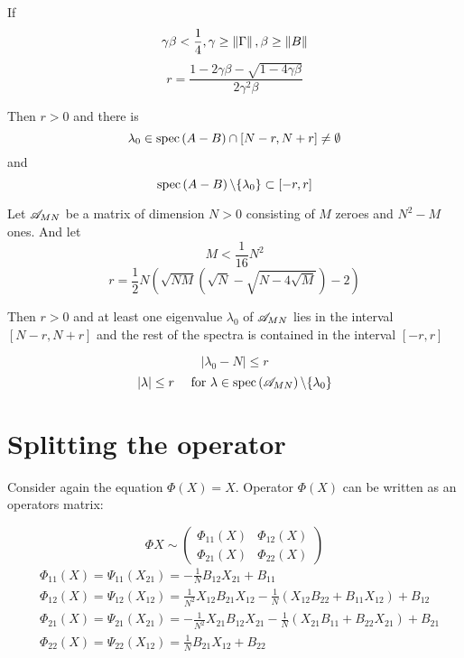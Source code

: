 \documentclass{article}
\begin{document}
\begin{lemma}
    If
    \[\gamma\beta<\frac14, \gamma\geq\left\|{\Gamma}\right\|, \beta\geq\left\|{B}\right\|\]
    \[r = \frac{1 - 2\gamma\beta - \sqrt{1-4\gamma\beta}}{2 \gamma^2 \beta}\]

    Then $r>0$ and there is
	\[ \lambda_0\in\mathrm{spec}\left({A-B}\right) \cap \left[N-r,N+r\right] \neq\emptyset \]
	and
	\[ \mathrm{spec}\left({A-B}\right)\backslash\{\lambda_0\} \subset \left[-r,r\right] \]
\end{lemma}
\begin{thm}
    Let \( \mathscr{A}_{{M}{N}} \) be a matrix of dimension \( N>0 \)
    consisting of \( M \) zeroes and \( N^2-M \)  ones.
    And let
    \[ M < \frac{1}{16} N^2 \]
    \[ r = \frac12 N
        \left(
        \sqrt{NM}(\sqrt{N} - \sqrt{N-4\sqrt{M}}) - 2
        \right) \]

    Then $r>0$ and at least one eigenvalue \( \lambda_0 \) of \( \mathscr{A}_{{M}{N}} \) lies in the interval \(\left[N-r,N+r\right]\)
	and the rest of the spectra is contained in the interval \( \left[-r,r\right] \)

    \[ \left|\lambda_0 - N\right| \leq r \]
    \[ \left|\lambda\right| \leq r \quad \text{ for } \lambda\in\mathrm{spec}\left({\mathscr{A}_{{M}{N}}}\right)\backslash\{\lambda_0\} \]
\end{thm}

\section{Splitting the operator}
Consider again the equation \( \Phi(X) = X \).
Operator \( \Phi(X) \) can be written as an operators matrix:

\[
    \Phi X \sim
    \begin{pmatrix}
        \Phi_{11}(X) & \Phi_{12}(X) \\
        \Phi_{21}(X) & \Phi_{22}(X)
    \end{pmatrix}
\]
\begin{subequations}
    \begin{align}
        \label{eq:split11}
        & \Phi_{11}(X) = \Psi_{11}(X_{21}) = -\frac1N B_{12}X_{21} + B_{11} \\
        \label{eq:split12}
        & \Phi_{12}(X) = \Psi_{12}(X_{12}) = \frac{1}{N^2} X_{12}B_{21}X_{12} -
                                   \frac1N\left(X_{12}B_{22} +
                                   B_{11}X_{12}\right) + B_{12} \\
        \label{eq:split21}
        & \Phi_{21}(X) = \Psi_{21}(X_{21}) = -\frac{1}{N^2} X_{21}B_{12}X_{21} -
                                   \frac1N\left(X_{21}B_{11} +
                                   B_{22}X_{21}\right) +
                                   B_{21} \\
        \label{eq:split22}
        & \Phi_{22}(X) = \Psi_{22}(X_{12}) = \frac1N B_{21}X_{12} + B_{22}
    \end{align}
\end{subequations}
\end{document}
